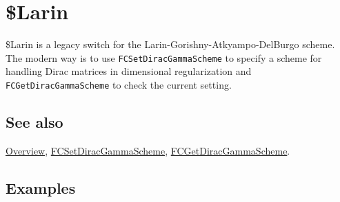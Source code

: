 \documentclass[../FeynCalcManual.tex]{subfiles}
\begin{document}
\hypertarget{dollarlarin}{
\section{\$Larin}\label{dollarlarin}}

\$Larin is a legacy switch for the Larin-Gorishny-Atkyampo-DelBurgo
scheme. The modern way is to use \texttt{FCSetDiracGammaScheme} to
specify a scheme for handling Dirac matrices in dimensional
regularization and \texttt{FCGetDiracGammaScheme} to check the current
setting.

\subsection{See also}

\hyperlink{toc}{Overview},
\hyperlink{fcsetdiracgammascheme}{FCSetDiracGammaScheme},
\hyperlink{fcgetdiracgammascheme}{FCGetDiracGammaScheme}.

\subsection{Examples}
\end{document}
